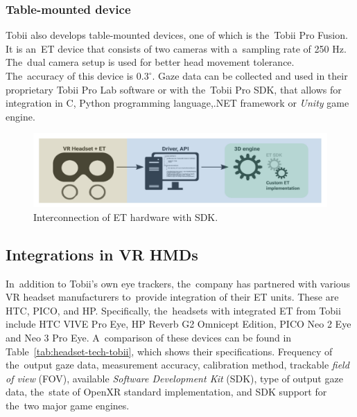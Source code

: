 \subsubsection*{Table-mounted device}
Tobii also develops table-mounted devices, one of which is the~Tobii Pro Fusion. It is an~ET device that consists of two cameras with a~sampling rate of 250 Hz. The~dual camera setup is used for better head movement tolerance. The~accuracy of this device is $0.3^{\circ}$. Gaze data can be collected and used in their proprietary Tobii Pro Lab software or with the~Tobii Pro SDK, that allows for integration in C, Python programming language,.NET framework or \emph{Unity} game engine.~\cite{tobii-fusion, tobii-pro-sdk}

\begin{figure}[!b]\centering
    \includegraphics[width=\textwidth]{img/ET-SDK.jpg}
    \caption[Interconnection of ET hardware with SDK.]{Interconnection of ET hardware with SDK.~\cite[p.~4]{ugwitz2022}}
    \label{fig:et-sdk}
\end{figure}

\newpage

\subsection{Integrations in VR HMDs}
\label{sec:integrations}

In~addition to Tobii's own eye trackers, the~company has partnered with various VR headset manufacturers to~provide integration of their ET units. These are HTC, PICO, and HP. Specifically, the~headsets with integrated ET from Tobii include HTC VIVE Pro Eye, HP Reverb G2 Omnicept Edition, PICO Neo 2 Eye and Neo 3 Pro Eye. A~comparison of these devices can be found in Table~\ref{tab:headset-tech-tobii}, which shows their specifications. Frequency of the~output gaze data, measurement accuracy, calibration method, trackable \emph{field of view} (FOV), available \emph{Software Development Kit} (SDK), type of output gaze data, the~state of OpenXR standard implementation, and SDK support for the~two major game engines.

